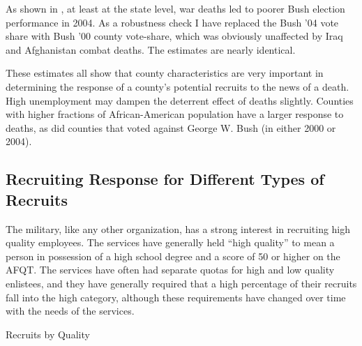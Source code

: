 \documentclass[12pt] {article}
\begin{document}
As shown in \cite{Ted-Miguel-Bush-Deaths}, at least at the state
level, war deaths led to poorer Bush election performance in 2004.
As a robustness check I have replaced the Bush '04 vote share with
Bush '00 county vote-share, which was obviously unaffected by Iraq
and Afghanistan combat deaths. The estimates are nearly identical. 

These estimates all show that county characteristics are very important
in determining the response of a county's potential recruits to the
news of a death. High unemployment may dampen the deterrent effect of deaths slightly.
Counties with higher fractions of African-American population have
a larger response to deaths, as did counties that voted against George
W. Bush (in either 2000 or 2004).


\subsection{Recruiting Response for Different Types of Recruits \label{sub:Different Recruit Types}}


The military, like any other organization, has a strong interest in
recruiting high quality employees. The services have generally held {}``high
quality'' to mean a person in possession of a high school degree
and a score of 50 or higher on the AFQT. The services have often had
separate quotas for high and low quality enlistees, and they have
generally required that a high percentage of their recruits fall into
the high category, although these requirements have changed over time
with the needs of the services. 

\begin{table}
\caption{Recruits by Quality}
\label{Flo: Recs by QualityLN}
\end{table}
\end{document}
